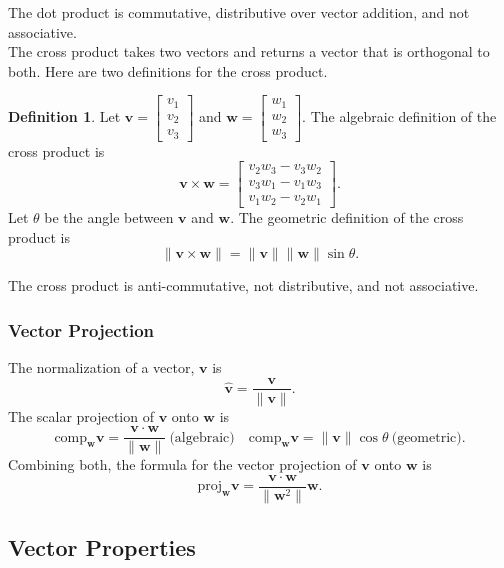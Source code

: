 \documentclass[11pt]{scrartcl}
\theoremstyle{plain}
\theoremstyle{definition}
\newtheorem*{definition}{Definition}
\theoremstyle{remark}
\begin{document}
The dot product is commutative, distributive over vector addition, and not associative. \\[-0.5em]

The cross product takes two vectors and returns a vector that is orthogonal to both. Here are two definitions for 
the cross product.

\begin{definition}
    Let $\mathbf{v}=\begin{bmatrix}v_{1} \\ v_{2} \\ v_{3}\end{bmatrix}$ and $\mathbf{w}=\begin{bmatrix}w_{1} \\ 
    w_{2} \\ w_{3}\end{bmatrix}$. The algebraic definition of the cross product is
    \[ \mathbf{v}\times \mathbf{w}=\begin{bmatrix}v_{2}w_{3}-v_{3}w_{2} \\ v_{3}w_{1}-v_{1}w_{3} \\ 
    v_{1}w_{2}-v_{2}w_{1} \end{bmatrix}. \]
    Let $\theta$ be the angle between $\mathbf{v}$ and $\mathbf{w}$. The geometric definition of the cross product is 
    \[ \lVert \mathbf{v}\times \mathbf{w} \rVert=\lVert \mathbf{v} \rVert \lVert \mathbf{w} \rVert \sin \theta. \]
\end{definition}

The cross product is anti-commutative, not distributive, and not associative.

\subsubsection{Vector Projection}

The normalization of a vector, $\mathbf{v}$ is
\[ \hat{\mathbf{v}}=\frac{\mathbf{v}}{\lVert \mathbf{v} \rVert }. \]
The scalar projection of $\mathbf{v}$ onto $\mathbf{w}$ is 
\[ \text{comp}_{\mathbf{w}}\mathbf{v} = \frac{{\mathbf{v}\cdot \mathbf{w}}}{\lVert \mathbf{w} \rVert }\ 
\text{(algebraic)}\quad \text{comp}_{\mathbf{w}}\mathbf{v} = \lVert \mathbf{v} \rVert \cos \theta\ \text{(geometric)}.  \]
Combining both, the formula for the vector projection of $\mathbf{v}$ onto $\mathbf{w}$ is
\[ \text{proj}_{\mathbf{w}}\mathbf{v} = \frac{{\mathbf{v}\cdot \mathbf{w}}}{\lVert \mathbf{w}^{2} \rVert }\mathbf{w}. \]

\subsection{Vector Properties}
\end{document}
